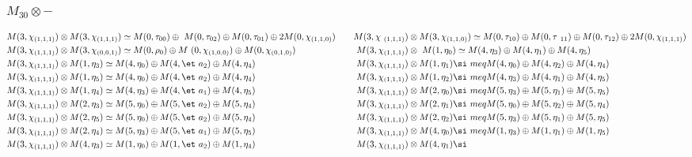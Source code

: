 \subsubsection{$M_30\otimes -$}
\begin{align*}
M(3,\chi_{(1,1,1)}) &\otimes M(3,\chi_{(1,1,1)}) \simeq M(0,\tau_{00}) \oplus \
M(0,\tau_{02}) \oplus M(0,\tau_{01}) \oplus 2 M(0,\chi_{(1,1,0)}) &&& M(3,\chi\
_{(1,1,1)}) &\otimes M(3,\chi_{(1,1,0)}) \simeq M(0,\tau_{10}) \oplus M(0,\tau\
_{11}) \oplus M(0,\tau_{12}) \oplus 2 M(0,\chi_{(1,1,1)})\\
M(3,\chi_{(1,1,1)}) &\otimes M(3,\chi_{(0,0,1)}) \simeq M(0,\rho_{0}) \oplus M\
(0,\chi_{(1,0,0)}) \oplus M(0,\chi_{(0,1,0)}) &&& M(3,\chi_{(1,1,1)}) &\otimes\
 M(1,\eta_{0}) \simeq M(4,\eta_{3}) \oplus M(4,\eta_{1}) \oplus M(4,\eta_{5})\
\\
M(3,\chi_{(1,1,1)}) &\otimes M(1,\eta_{3}) \simeq M(4,\eta_{0}) \oplus M(4,\et\
a_{2}) \oplus M(4,\eta_{4}) &&& M(3,\chi_{(1,1,1)}) &\otimes M(1,\eta_{1}) \si\
meq M(4,\eta_{0}) \oplus M(4,\eta_{2}) \oplus M(4,\eta_{4})\\
M(3,\chi_{(1,1,1)}) &\otimes M(1,\eta_{5}) \simeq M(4,\eta_{0}) \oplus M(4,\et\
a_{2}) \oplus M(4,\eta_{4}) &&& M(3,\chi_{(1,1,1)}) &\otimes M(1,\eta_{2}) \si\
meq M(4,\eta_{3}) \oplus M(4,\eta_{1}) \oplus M(4,\eta_{5})\\
M(3,\chi_{(1,1,1)}) &\otimes M(1,\eta_{4}) \simeq M(4,\eta_{3}) \oplus M(4,\et\
a_{1}) \oplus M(4,\eta_{5}) &&& M(3,\chi_{(1,1,1)}) &\otimes M(2,\eta_{0}) \si\
meq M(5,\eta_{3}) \oplus M(5,\eta_{1}) \oplus M(5,\eta_{5})\\
M(3,\chi_{(1,1,1)}) &\otimes M(2,\eta_{3}) \simeq M(5,\eta_{0}) \oplus M(5,\et\
a_{2}) \oplus M(5,\eta_{4}) &&& M(3,\chi_{(1,1,1)}) &\otimes M(2,\eta_{1}) \si\
meq M(5,\eta_{0}) \oplus M(5,\eta_{2}) \oplus M(5,\eta_{4})\\
M(3,\chi_{(1,1,1)}) &\otimes M(2,\eta_{5}) \simeq M(5,\eta_{0}) \oplus M(5,\et\
a_{2}) \oplus M(5,\eta_{4}) &&& M(3,\chi_{(1,1,1)}) &\otimes M(2,\eta_{2}) \si\
meq M(5,\eta_{3}) \oplus M(5,\eta_{1}) \oplus M(5,\eta_{5})\\
M(3,\chi_{(1,1,1)}) &\otimes M(2,\eta_{4}) \simeq M(5,\eta_{3}) \oplus M(5,\et\
a_{1}) \oplus M(5,\eta_{5}) &&& M(3,\chi_{(1,1,1)}) &\otimes M(4,\eta_{0}) \si\
meq M(1,\eta_{3}) \oplus M(1,\eta_{1}) \oplus M(1,\eta_{5})\\
M(3,\chi_{(1,1,1)}) &\otimes M(4,\eta_{3}) \simeq M(1,\eta_{0}) \oplus M(1,\et\
a_{2}) \oplus M(1,\eta_{4}) &&& M(3,\chi_{(1,1,1)}) &\otimes M(4,\eta_{1}) \si\

\end{align*}

